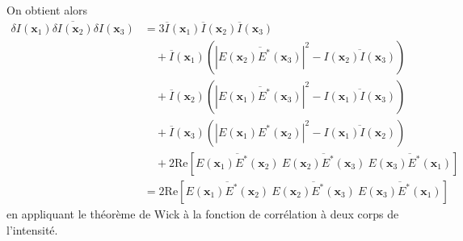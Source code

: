 On obtient alors 
\begin{align}
\overline{\delta I(\mathbf{x}_1) \delta I(\mathbf{x}_2) \delta I(\mathbf{x}_3)} &= 3 \overline{I}(\mathbf{x}_1) \overline{I}(\mathbf{x}_2) \overline{I}(\mathbf{x}_3)\\
\nonumber & \quad + \overline{I}(\mathbf{x}_1) \left( \left|\overline{E(\mathbf{x}_2)E^*(\mathbf{x}_3)} \right|^2 -\overline{I(\mathbf{x}_2)I(\mathbf{x}_3)}\right) \\
\nonumber & \quad + \overline{I}(\mathbf{x}_2) \left( \left|\overline{E(\mathbf{x}_1)E^*(\mathbf{x}_3)}\right|^2 - \overline{I(\mathbf{x}_1)I(\mathbf{x}_3)}\right)\\
\nonumber & \quad + \overline{I}(\mathbf{x}_3) \left(\left|E(\mathbf{x}_1)E^*(\mathbf{x}_2)\right|^2 -\overline{I(\mathbf{x}_1)I(\mathbf{x}_2)}\right)\\
\nonumber & \quad + 2\mathrm{Re}\left[ \overline{E(\mathbf{x}_1)E^*(\mathbf{x}_2)} \: \overline{E(\mathbf{x}_2)E^*(\mathbf{x}_3)} \: \overline{E(\mathbf{x}_3)E^*(\mathbf{x}_1)}\right] \\
&= 2\mathrm{Re}\left[ \overline{E(\mathbf{x}_1)E^*(\mathbf{x}_2)} \: \overline{E(\mathbf{x}_2)E^*(\mathbf{x}_3)} \: \overline{E(\mathbf{x}_3)E^*(\mathbf{x}_1)}\right]
\end{align}
en appliquant le théorème de Wick à la fonction de corrélation à deux corps de l'intensité.
